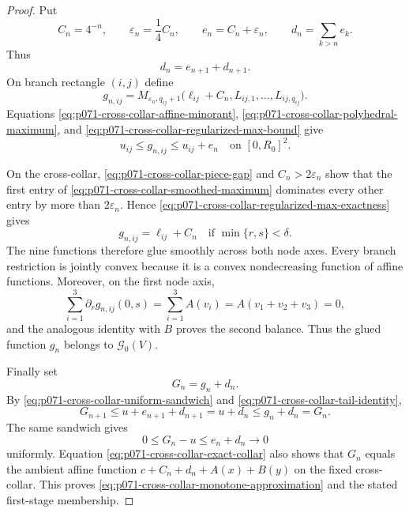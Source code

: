 \begin{proof}
Put
\[
 C_n=4^{-n},\qquad \varepsilon_n=\frac14C_n,
 \qquad e_n=C_n+\varepsilon_n,
 \qquad d_n=\sum_{k>n}e_k.
\]
Thus
\begin{equation}
                         d_n=e_{n+1}+d_{n+1}.
 \label{eq:p071-cross-collar-tail-identity}
\end{equation}
On branch rectangle $(i,j)$ define
\begin{equation}
 g_{n,ij}=M_{\varepsilon_n,q_{ij}+1}
   \bigl(\ell_{ij}+C_n,L_{ij,1},\ldots,L_{ij,q_{ij}}\bigr).
 \label{eq:p071-cross-collar-smoothed-maximum}
\end{equation}
Equations \eqref{eq:p071-cross-collar-affine-minorant},
\eqref{eq:p071-cross-collar-polyhedral-maximum}, and
\eqref{eq:p071-cross-collar-regularized-max-bound} give
\begin{equation}
                   u_{ij}\leq g_{n,ij}\leq u_{ij}+e_n
                   \quad\text{on }[0,R_0]^2.
 \label{eq:p071-cross-collar-uniform-sandwich}
\end{equation}

On the cross-collar, \eqref{eq:p071-cross-collar-piece-gap} and
$C_n>2\varepsilon_n$ show that the first entry of
\eqref{eq:p071-cross-collar-smoothed-maximum} dominates every other entry
by more than $2\varepsilon_n$.  Hence
\eqref{eq:p071-cross-collar-regularized-max-exactness} gives
\begin{equation}
                         g_{n,ij}=\ell_{ij}+C_n
                         \quad\text{if }\min\{r,s\}<\delta.
 \label{eq:p071-cross-collar-exact-collar}
\end{equation}
The nine functions therefore glue smoothly across both node axes.  Every
branch restriction is jointly convex because it is a convex nondecreasing
function of affine functions.  Moreover, on the first node axis,
\[
 \sum_{i=1}^3\partial_rg_{n,ij}(0,s)
   =\sum_{i=1}^3 A(v_i)=A(v_1+v_2+v_3)=0,
\]
and the analogous identity with $B$ proves the second balance.  Thus the
glued function $g_n$ belongs to $\mathcal G_0(V)$.

Finally set
\[
                              G_n=g_n+d_n.
\]
By \eqref{eq:p071-cross-collar-uniform-sandwich} and
\eqref{eq:p071-cross-collar-tail-identity},
\[
 G_{n+1}\leq u+e_{n+1}+d_{n+1}
            =u+d_n\leq g_n+d_n=G_n.
\]
The same sandwich gives
\[
                 0\leq G_n-u\leq e_n+d_n\longrightarrow0
\]
uniformly.  Equation \eqref{eq:p071-cross-collar-exact-collar} also shows
that $G_n$ equals the ambient affine function
$c+C_n+d_n+A(x)+B(y)$ on the fixed cross-collar.  This proves
\eqref{eq:p071-cross-collar-monotone-approximation} and the stated
first-stage membership.
\end{proof}
